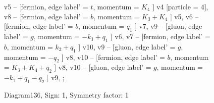\documentclass{revtex4}
\begin{document}
\begin{figure}[!htb]
\begin{center}
{v5 -- [fermion, edge label' = \(t\), momentum = \(K_{4}\) ] v4 [particle = \(4\)], 
v8 -- [fermion, edge label' = \(b\), momentum = \(K_{3} + K_{4}\) ] v5, 
v6 -- [fermion, edge label' = \(b\), momentum = \(q_{1}\) ] v7, 
v9 -- [gluon, edge label' = \(g\), momentum = \(-k_{1} + q_{1}\) ] v6, 
v7 -- [fermion, edge label' = \(b\), momentum = \(k_{2} + q_{1}\) ] v10, 
v9 -- [gluon, edge label' = \(g\), momentum = \(-q_{2}\) ] v8, 
v10 -- [fermion, edge label' = \(b\), momentum = \(K_{3} + K_{4} + q_{2}\) ] v8, 
v10 -- [gluon, edge label' = \(g\), momentum = \(-k_{1} + q_{1} - q_{2}\) ] v9, 
};
\end{center}
\caption{Diagram136, Sign: 1, Symmetry factor: 1}
\end{figure}
\newpage
\end{document}
